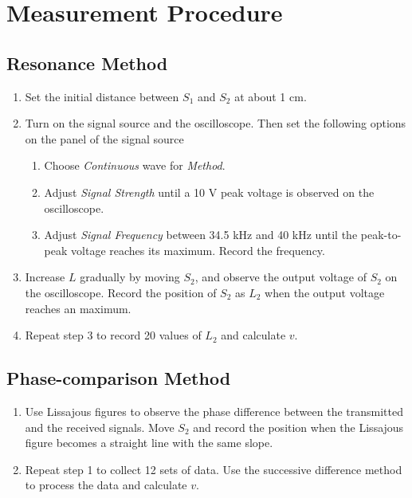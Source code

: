 \documentclass[12pt]{article}
\begin{document}
\section{Measurement Procedure}
\subsection{Resonance Method}
\begin{enumerate}
\item Set the initial distance between $S_1$ and $S_2$ at about 1 cm.
\item Turn on the signal source and the oscilloscope. Then set the following options on the panel of the signal source
\begin{enumerate}[(1)]
\item Choose \emph{Continuous} wave for \emph{Method}.
\item Adjust \emph{Signal Strength} until a 10 V peak voltage is observed on the oscilloscope.
\item Adjust \emph{Signal Frequency} between 34.5 kHz and 40 kHz until the peak-to-peak voltage reaches its maximum. Record the frequency.
\end{enumerate}
\item Increase $L$ gradually by moving $S_2$, and observe the output voltage of $S_2$ on the oscilloscope. Record the position of $S_2$ as $L_2$ when the output voltage reaches an maximum.
\item Repeat step 3 to record 20 values of $L_2$ and calculate $v$.
\end{enumerate}
\subsection{Phase-comparison Method}
\begin{enumerate}
\item Use Lissajous figures to observe the phase difference between the transmitted and the received signals. Move $S_2$ and record the position when the Lissajous figure
becomes a straight line with the same slope.
\item Repeat step 1 to collect 12 sets of data. Use the successive difference method to process the data and calculate $v$.
\end{enumerate}
\end{document}
